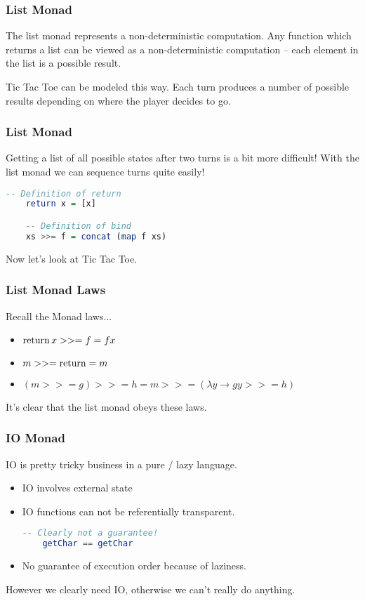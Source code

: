 \documentclass[presentation.tex]{subfiles}
\begin{document}
\begin{frame}
  \frametitle{List Monad}

  The list monad represents a non-deterministic computation. Any
  function which returns a list can be viewed as a non-deterministic
  computation -- each element in the list is a possible result.

  Tic Tac Toe can be modeled this way. Each turn produces a number of
  possible results depending on where the player decides to go.
\end{frame}

\begin{frame}[fragile]
  \frametitle{List Monad}

  Getting a list of all possible states after two turns is a bit more
  difficult! With the list monad we can sequence turns quite easily!

  \begin{lstlisting}[frame=single,language=Haskell,breaklines=true]
    -- Definition of return
    return x = [x]

    -- Definition of bind
    xs >>= f = concat (map f xs)
  \end{lstlisting}

  Now let's look at Tic Tac Toe.
\end{frame}

\begin{frame}[fragile]
  \frametitle{List Monad Laws}

  Recall the Monad laws...

  \begin{itemize}
  \item
    $\operatorname{return} x >>= f = f x$
  \item
    $m >>= \operatorname{return} = m$
  \item
    $(m >>= g) >>= h = m >>= (\lambda y \rightarrow g y >>= h)$
  \end{itemize}

  It's clear that the list monad obeys these laws.
\end{frame}

\begin{frame}[fragile]
  \frametitle{IO Monad}

  IO is pretty tricky business in a pure / lazy language.

  \begin{itemize}
  \item IO involves external state
  \item IO functions can not be referentially transparent.

  \begin{lstlisting}[frame=single,language=Haskell,breaklines=true]
    -- Clearly not a guarantee!
    getChar == getChar
  \end{lstlisting}

  \item No guarantee of execution order because of laziness.
  \end{itemize}

  However we clearly need IO, otherwise we can't really do anything.
\end{frame}
\end{document}
